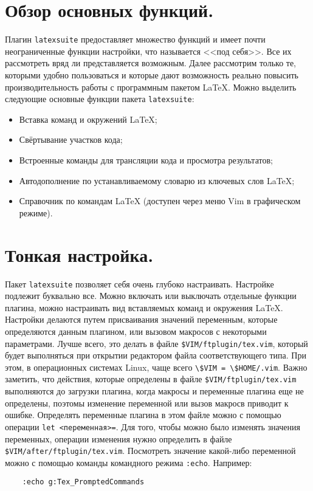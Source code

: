 \documentclass[a4paper]{article}
\begin{document}
\part{Обзор основных функций.}\label{part:main-functions}
Плагин \texttt{latexsuite} предоставляет множество функций и имеет почти
неограниченные функции настройки, что называется <<под себя>>. Все их
рассмотреть вряд ли представляется возможным. Далее рассмотрим только те,
которыми удобно пользоваться и которые дают возможность реально 
повысить производительность работы с программным пакетом \LaTeX.
Можно выделить следующие основные функции пакета \texttt{latexsuite}:
\begin{itemize}
	\item Вставка команд и окружений \LaTeX;
	\item Свёртывание участков кода;
	\item Встроенные команды для трансляции кода и просмотра результатов;
	\item Автодополнение по устанавливаемому словарю из ключевых слов \LaTeX{};
	\item Справочник по командам \LaTeX{} (доступен через меню Vim в графическом режиме).
\end{itemize}
\part{Тонкая настройка.}\label{part:settings}
Пакет \texttt{latexsuite} позволяет себя очень глубоко настраивать.
Настройке подлежит буквально все. Можно включать или выключать отдельные функции плагина,
можно настраивать вид вставляемых команд и окружения \LaTeX. Настройки делаются путем
присваивания значений переменным, которые определяются данным плагином, или вызовом 
макросов с некоторыми параметрами. Лучше всего, это делать в файле \verb|$VIM/ftplugin/tex.vim|,
который будет выполняться при открытии редактором файла соответствующего типа. 
При этом, в операционных системах Linux, 
чаще всего \verb|\$VIM = \$HOME/.vim|. Важно заметить, что действия, которые определены в
файле \verb|$VIM/ftplugin/tex.vim| выполняются до загрузки плагина, когда макросы и переменные
плагина еще не определены, поэтомы изменение переменной или вызов макросв приводит к ошибке. 
Определять переменные плагина в этом файле можно с помощью операции \verb|let <переменная>=|. 
Для того, чтобы можно было изменять значения переменных, операции изменения нужно определить в файле
\verb|$VIM/after/ftplugin/tex.vim|.\sloppy
Посмотреть значение какой-либо переменной можно с помощью команды командного режима \verb|:echo|. 
Например:
\begin{verbatim}
	:echo g:Tex_PromptedCommands
\end{verbatim}
\end{document}
